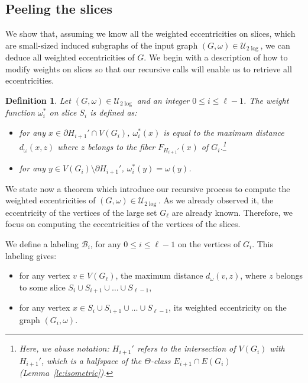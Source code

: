\documentclass[11pt,letterpaper]{article}
\newtheorem{definition}{Definition}
\newcommand{\ulog}{\mathcal{U}_{2\log}}
\begin{document}
\subsection{Peeling the slices} \label{subsec:slices}

We show that, assuming we know all the weighted eccentricities on slices, which are small-sized induced subgraphs of the input graph $(G,\omega) \in \ulog$, we can deduce all weighted eccentricities of $G$. We begin with a description of how to modify weights on slices so that our recursive calls will enable us to retrieve all eccentricities.

\begin{definition}
Let $(G,\omega) \in \ulog$ and an integer $0\le i\le \ell-1$. The weight function $\omega_i^*$ on slice $S_i$ is defined as:
\begin{itemize}
\item for any $x \in \partial H_{i+1}' \cap V(G_i)$, $\omega_i^*(x)$ is equal to 
the maximum distance $d_{\omega}(x,z)$ where $z$ belongs to the fiber $F_{H_{i+1}'}(x)$ of $G_i$.\footnote{Here, we abuse notation: $H_{i+1}'$ refers to the intersection of $V(G_i)$ with $H_{i+1}'$, which is a halfspace of the $\Theta$-class $E_{i+1} \cap E(G_i)$ (Lemma~\ref{le:isometric}).}
\item for any $y \in V(G_i) \setminus \partial H_{i+1}'$, $\omega_i^*(y) = \omega(y)$.
\end{itemize}
\label{def:weights_slices}
\end{definition}

We state now a theorem which introduce our recursive process to compute the weighted eccentricities of $(G,\omega) \in \ulog$. As we already observed it, the eccentricity of the vertices of the large set $G_{\ell}$ are already known. Therefore, we focus on computing the eccentricities of the vertices of the slices. 

We define a labeling $\mathcal{B}_i$, for any $0\le i\le \ell-1$ on the vertices of $G_{i}$. This labeling gives:
\begin{itemize}
\item for any vertex $v \in V(G_{\ell})$, the maximum distance $d_{\omega}(v,z)$, where $z$ belongs to some slice $S_i \cup S_{i+1} \cup \ldots \cup S_{\ell - 1}$,
\item for any vertex $x \in S_i \cup S_{i+1} \cup \ldots \cup S_{\ell - 1}$, its weighted eccentricity on the graph $(G_i,\omega)$.
\end{itemize}
\end{document}

